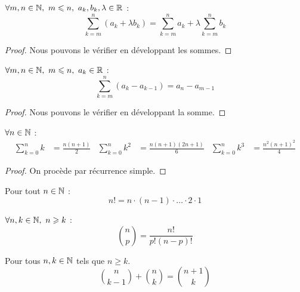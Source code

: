 \begin{proposition}
    $\forall m, n \in \mathbb{N},\ m \leqslant n,\ a_k, b_k, \lambda \in \mathbb{R}$ :
    \[ \sum_{k = m}^{n} (a_k + \lambda b_k) = \sum_{k = m}^n a_k + \lambda \sum_{k = m}^n b_k \]
\end{proposition}

\begin{proof}
	Nous pouvons le vérifier en développant les sommes.
\end{proof}

\begin{proposition}
    $\forall m, n \in \mathbb{N},\ m \leqslant n,\ a_k \in \mathbb{R}$ :
    \[ \sum_{k = m}^n (a_k - a_{k - 1}) = a_n - a_{m - 1} \]
\end{proposition}

\begin{proof}
	Nous pouvons le vérifier en développant la somme.
\end{proof}

\begin{proposition}
	$\forall n \in \mathbb{N}$ :
	\begin{align*}
		\sum_{k = 0}^{n} k &= \frac{n(n+1)}{2} & 
		\sum_{k = 0}^{n} k^2 &= \frac{n(n+1)(2n+1)}{6} &
		\sum_{k = 0}^{n} k^3 &= \frac{n^2(n+1)^2}{4}
	\end{align*}
\end{proposition}

\begin{proof}
	On procède par récurrence simple.
\end{proof}

\begin{definition}
	Pour tout $n \in \mathbb{N}$ :
	\[ n! = n \cdot (n - 1) \cdot \ldots \cdot 2 \cdot 1 \]
\end{definition}

\begin{proposition}
	$\forall n, k \in \mathbb{N},\ n \geqslant k$ :
	\[ \binom{n}{p} = \frac{n!}{p!(n - p)!} \]
\end{proposition}

\begin{proposition}
	Pour tous $n, k \in \mathbb{N}$ tels que $n \geq k$.
	\[
	\binom{n}{k - 1} + \binom{n}{k} = \binom{n+1}{k}
	\]
\end{proposition}

